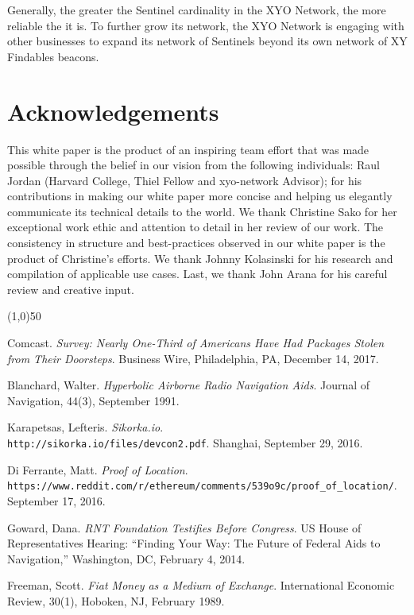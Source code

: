 \documentclass{article}
\begin{document}
Generally, the greater the Sentinel cardinality in the XYO Network, the more reliable the it is. To further grow its network, the XYO Network is engaging with other businesses to expand its network of Sentinels beyond its own network of XY Findables beacons.

\section {Acknowledgements}
This white paper is the product of an inspiring team effort that was made possible through the belief in our vision from the following individuals: Raul Jordan (Harvard College, Thiel Fellow and \Gls{xyo-network} Advisor); for his contributions in making our white paper more concise and helping us elegantly communicate its technical details to the world. We thank Christine Sako for her exceptional work ethic and attention to detail in her review of our work. The consistency in structure and best-practices observed in our white paper is the product of Christine's efforts. We thank Johnny Kolasinski for his research and compilation of applicable use cases. Last, we thank John Arana for his careful review and creative input.

\begin{center}
\line(1,0){50}
\end{center}



\begin{thebibliography}{9}

Comcast.
\textit{Survey: Nearly One-Third of Americans Have Had Packages Stolen from Their Doorsteps}.
Business Wire, Philadelphia, PA, December 14, 2017.

Blanchard, Walter.
\textit{Hyperbolic Airborne Radio Navigation Aids}.
Journal of Navigation, 44(3), September 1991.

Karapetsas, Lefteris.
\textit{Sikorka.io}.
\\\texttt{http://sikorka.io/files/devcon2.pdf}.
Shanghai, September 29, 2016.

Di Ferrante, Matt.
\textit{Proof of Location}.
\\\texttt{https://www.reddit.com/r/ethereum/comments/539o9c/proof\_of\_location/}.
September 17, 2016.

Goward, Dana.
\textit{RNT Foundation Testifies Before Congress}.
US House of Representatives Hearing: ``Finding Your Way: The Future of Federal Aids to Navigation,'' Washington, DC, February 4, 2014.

Freeman, Scott.
\textit{Fiat Money as a Medium of Exchange}.
International Economic Review, 30(1), Hoboken, NJ, February 1989.
\end{thebibliography}

\clearpage

\printglossaries

\end{document}
